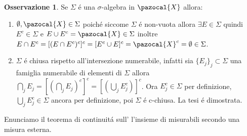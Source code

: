 \documentclass[11pt,a4paper]{report}
\theoremstyle{plain}
\theoremstyle{definition}
\newtheorem{oss}[thm]{Osservazione} %
\newcommand{\X}{\pazocal{X}}
\begin{document}
\begin{oss}
	Se $\Sigma$ \'e una $\sigma$-algebra in $\X$ allora:
	\begin{enumerate}
		\item $\emptyset, \X \in \Sigma$ poich\'e siccome $\Sigma$ \'e non-vuota allora $\exists E \in \Sigma$ quindi $E^c \in \Sigma$ e $E \cup E^c = \X \in \Sigma$ inoltre $E \cap E^c = [(E \cap E^c)^c]^c = [E^c \cup E]^c = \X^c = \emptyset \in \Sigma$.
		\item $\Sigma$ \'e chiusa rispetto all'intersezione numerabile, infatti sia $\{E_j\}_j \subset \Sigma$ una famiglia numerabile di elementi di $\Sigma$ allora $\bigcap\limits_{j}E_j = [(\bigcap\limits_{j}E_j)^c]^c = [(\bigcup\limits_{j}E_j^c)]^c$. Ora $E_j^c \in \Sigma$ per definizione, $\bigcup\limits_{j}E_j^c \in \Sigma$ ancora per definizione, poi $\Sigma$ \'e c-chiusa. La tesi \'e dimostrata.
	\end{enumerate}
\end{oss}

Enunciamo il teorema di continuit\'a sull' l'insieme di misurabili secondo una misura esterna.
\end{document}
